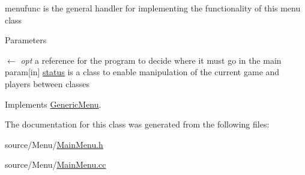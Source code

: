 menufunc is the general handler for implementing the functionality of this menu class 
\begin{DoxyParams}{Parameters}
\item[\mbox{$\leftarrow$} {\em opt}]a reference for the program to decide where it must go in the main param\mbox{[}in\mbox{]} \hyperlink{classstatus}{status} is a class to enable manipulation of the current game and players between classes \end{DoxyParams}


Implements \hyperlink{classGenericMenu_a290ad7ec3331edc968190b1d7b48a397}{GenericMenu}.

The documentation for this class was generated from the following files:\begin{DoxyCompactItemize}
\item 
source/Menu/\hyperlink{MainMenu_8h}{MainMenu.h}\item 
source/Menu/\hyperlink{MainMenu_8cc}{MainMenu.cc}\end{DoxyCompactItemize}
